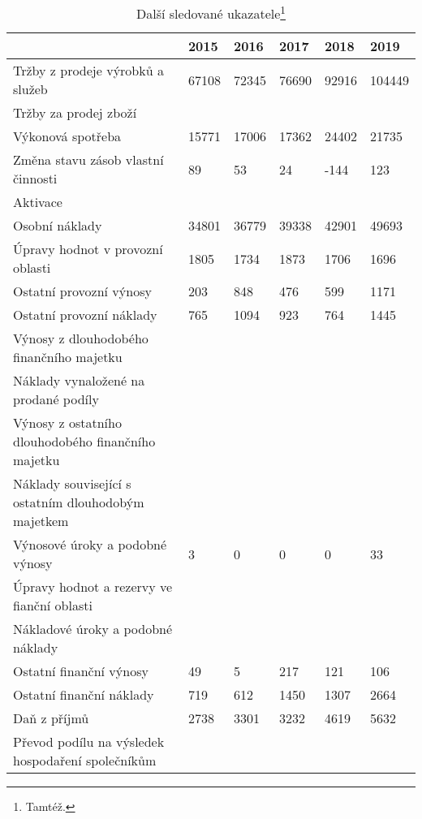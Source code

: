 \begin{table}[!hbtp]
\begin{tabular}{l|l|l|l|l|l|}
\cline{2-6}
 & 2015 & 2016 & 2017 & 2018 & 2019 \\ \hline
\multicolumn{1}{|l|}{Tržby z prodeje výrobků a služeb} & 67108 & 72345 & 76690 & 92916 & 104449 \\ \hline
\multicolumn{1}{|l|}{Tržby za prodej zboží} &  &  &  &  &  \\ \hline
\multicolumn{1}{|l|}{Výkonová spotřeba} & 15771 & 17006 & 17362 & 24402 & 21735 \\ \hline
\multicolumn{1}{|l|}{Změna stavu zásob vlastní činnosti} & 89 & 53 & 24 & -144 & 123 \\ \hline
\multicolumn{1}{|l|}{Aktivace} &  &  &  &  &  \\ \hline
\multicolumn{1}{|l|}{Osobní náklady} & 34801 & 36779 & 39338 & 42901 & 49693 \\ \hline
\multicolumn{1}{|l|}{Úpravy hodnot v provozní oblasti} & 1805 & 1734 & 1873 & 1706 & 1696 \\ \hline
\multicolumn{1}{|l|}{Ostatní provozní výnosy} & 203 & 848 & 476 & 599 & 1171 \\ \hline
\multicolumn{1}{|l|}{Ostatní provozní náklady} & 765 & 1094 & 923 & 764 & 1445 \\ \hline
\multicolumn{1}{|l|}{Výnosy z dlouhodobého finančního majetku} &  &  &  &  &  \\ \hline
\multicolumn{1}{|l|}{Náklady vynaložené na prodané podíly} &  &  &  &  &  \\ \hline
\multicolumn{1}{|l|}{Výnosy z ostatního dlouhodobého   finančního majetku} &  &  &  &  &  \\ \hline
\multicolumn{1}{|l|}{Náklady související s ostatním   dlouhodobým majetkem} &  &  &  &  &  \\ \hline
\multicolumn{1}{|l|}{Výnosové úroky a podobné výnosy} & 3 & 0 & 0 & 0 & 33 \\ \hline
\multicolumn{1}{|l|}{Úpravy hodnot a rezervy ve fianční   oblasti} &  &  &  &  &  \\ \hline
\multicolumn{1}{|l|}{Nákladové úroky a podobné náklady} &  &  &  &  &  \\ \hline
\multicolumn{1}{|l|}{Ostatní finanční výnosy} & 49 & 5 & 217 & 121 & 106 \\ \hline
\multicolumn{1}{|l|}{Ostatní finanční náklady} & 719 & 612 & 1450 & 1307 & 2664 \\ \hline
\multicolumn{1}{|l|}{Daň z příjmů} & 2738 & 3301 & 3232 & 4619 & 5632 \\ \hline
\multicolumn{1}{|l|}{Převod podílu na výsledek hospodaření   společníkům} &  &  &  &  &  \\ \hline
\end{tabular}
\caption[Další sledované ukazatele]{Další sledované ukazatele\footnote{Tamtéž.}}
\label{tab:Dalsi sledovane ukazatele}
\end{table}

